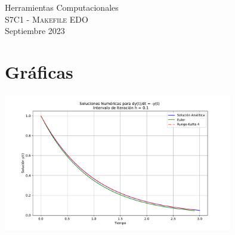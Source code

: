 \documentclass[11pt,letterpaper]{article}
\begin{document}
\begin{center}
{\Large Herramientas Computacionales} \\
S7C1 - \textsc{Makefile EDO}\\
Septiembre 2023\\
\end{center}


\noindent
\section{Gr\'aficas}
\begin{center}
\includegraphics[width=10cm]{plot_sol.pdf}
\end{center}  
\end{document}
